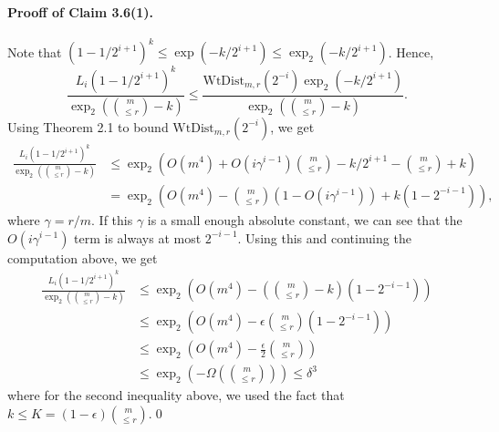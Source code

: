 \documentclass[10pt,a4paper]{article}
\begin{document}
\paragraph{Prooff of Claim 3.6(1).} Note that $(1-1/2^{i+1})^k\le\exp(-k/2^{i+1})\le\operatorname{exp}_2(-k/2^{i+1})$. Hence,
\[\frac{L_i(1-1/2^{i+1})^k}{\operatorname{exp}_2\left(\binom m{\le r}-k\right)}\le\frac{\mathrm{WtDist}_{m,r}(2^{-i})\operatorname{exp}_2(-k/2^{i+1})}{\operatorname{exp}_2\left(\binom m{\le r}-k\right)}.\]
Using Theorem 2.1 to bound $\mathrm{WtDist}_{m,r}(2^{-i})$, we get
\begin{align*}\frac{L_i(1-1/2^{i+1})^k}{\operatorname{exp}_2\left(\binom m{\le r}-k\right)}&\le\operatorname{exp}_2\left(O(m^4)+O(i\gamma^{i-1})\binom m{\le r}-k/2^{i+1}-\binom m{\le r}+k\right)\\&=\operatorname{exp}_2\left(O(m^4)-\binom m{\le r}(1-O(i\gamma^{i-1}))+k(1-2^{-i-1})\right),\end{align*}
where $\gamma=r/m$. If this $\gamma$ is a small enough absolute constant, we can see that the $O(i\gamma^{i-1})$ term is always at most $2^{-i-1}$. Using this and continuing the computation above, we get
\begin{align*}\frac{L_i(1-1/2^{i+1})^k}{\operatorname{exp}_2\left(\binom m{\le r}-k\right)}&\le\operatorname{exp}_2\left(O(m^4)-\left(\binom m{\le r}-k\right)(1-2^{-i-1})\right)\\&\le\operatorname{exp}_2\left(O(m^4)-\epsilon\binom m{\le r}(1-2^{-i-1})\right)\\&\le\operatorname{exp}_2\left(O(m^4)-\frac\epsilon2\binom m{\le r}\right)\\&\le\operatorname{exp}_2\left(-\Omega\left(\binom m{\le r}\right)\right)\le\delta^3\end{align*}
where for the second inequality above, we used the fact that $k\le K=(1-\epsilon)\binom m{\le r}$.\qed
\end{document}
